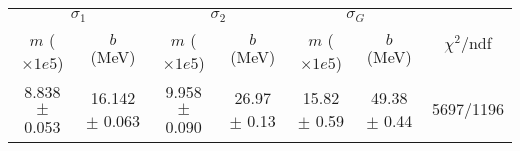 \begin{tabular}{cc|cc|cc||c}
\multicolumn{2}{c|}{$\sigma_1$} & \multicolumn{2}{|c}{$\sigma_2$} & \multicolumn{2}{|c}{$\sigma_G$}  & \multirow{2}{*}{$\chi^2/$ndf}\\
$m$ ($\times1e5$) & $b$ (MeV) & $m$ ($\times1e5$) & $b$ (MeV) & $m$ ($\times1e5$) & $b$ (MeV) & \\
\hline
8.838 $\pm$ 0.053 & 16.142 $\pm$ 0.063 & 9.958 $\pm$ 0.090 & 26.97 $\pm$ 0.13 & 15.82 $\pm$ 0.59 & 49.38 $\pm$ 0.44 & 5697/1196\\
\end{tabular}
